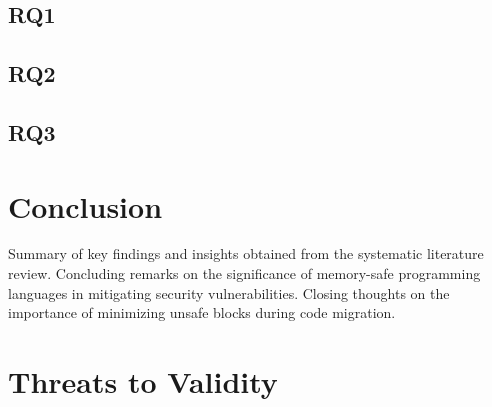 \documentclass[sigconf]{acmart}
\begin{document}
\subsection{RQ1}
\subsection{RQ2}
\subsection{RQ3}


\section{Conclusion}

Summary of key findings and insights obtained from the systematic literature review.
Concluding remarks on the significance of memory-safe programming languages in mitigating security vulnerabilities.
Closing thoughts on the importance of minimizing unsafe blocks during code migration.

\section{Threats to Validity}
\balance



\end{document}
